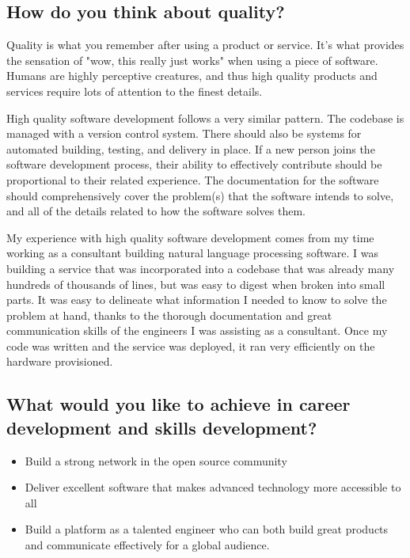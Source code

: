 \documentclass{article}
\begin{document}
\subsection{How do you think about quality?}

Quality is what you remember after using a product or service. It's what
provides the sensation of "wow, this really just works" when using a piece of
software. Humans are highly perceptive creatures, and thus high quality products
and services require lots of attention to the finest details.


High quality software development follows a very similar pattern. The codebase
is managed with a version control system. There should also be systems for
automated building, testing, and delivery in place. If a new person joins the
software development process, their ability to effectively contribute should be
proportional to their related experience. The documentation for the software
should comprehensively cover the problem(s) that the software intends to solve,
and all of the details related to how the software solves them.


My experience with high quality software development comes from my time working
as a consultant building natural language processing software. I was building a
service that was incorporated into a codebase that was already many hundreds of
thousands of lines, but was easy to digest when broken into small parts. It was
easy to delineate what information I needed to know to solve the problem at
hand, thanks to the thorough documentation and great communication skills of the
engineers I was assisting as a consultant. Once my code was written and the
service was deployed, it ran very efficiently on the hardware provisioned.


\subsection{What would you like to achieve in career development and skills
  development?}

\begin{itemize}
  \item Build a strong network in the open source community
  \item Deliver excellent software that makes advanced technology more
        accessible to all
  \item Build a platform as a talented engineer who can both build great
        products and communicate effectively for a global audience.
\end{itemize}
\end{document}
